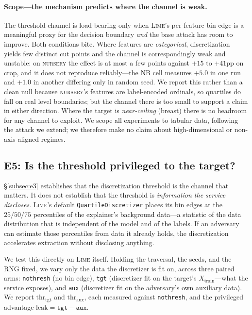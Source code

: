 \documentclass[sigconf,anonymous,review]{acmart}
\begin{document}
\paragraph{Scope---the mechanism predicts where the channel is weak.} The threshold channel is
load-bearing only when \textsc{Lime}'s per-feature bin edge is a meaningful proxy for the decision
boundary \emph{and} the base attack has room to improve. Both conditions bite. Where features are
\emph{categorical}, discretization yields few distinct cut points and the channel is correspondingly
weak and unstable: on \textsc{nursery} the effect is at most a few points against $+15$ to $+41$pp on
crop, and it does not reproduce reliably---the NB cell measures $+5.0$ in one run and $+1.0$ in
another differing only in random seed. We report this rather than a clean null because
\textsc{nursery}'s features are label-encoded ordinals, so quartiles do fall on real level
boundaries; but the channel there is too small to support a claim in either direction. Where the target is \emph{near-ceiling} (breast) there is
no headroom for any channel to exploit. We scope all experiments to tabular data, following the attack
we extend; we therefore make no claim about high-dimensional or non-axis-aligned regimes.

\subsection{E5: Is the threshold privileged to the target?}
\label{subsec:e5}
\S\ref{subsec:e3} establishes that the discretization threshold is the channel that matters. It does
not establish that the threshold is \emph{information the service discloses}. \textsc{Lime}'s default
\texttt{QuartileDiscretizer} places its bin edges at the $25/50/75$ percentiles of the explainer's
background data---a statistic of the data distribution that is independent of the model and of the
labels. If an adversary can estimate those percentiles from data it already holds, the discretization
accelerates extraction without disclosing anything.

We test this directly on \textsc{Lime} itself. Holding the traversal, the seeds, and the RNG fixed, we
vary only the data the discretizer is fit on, across three paired arms: \texttt{nothresh} (no bin
edge), \texttt{tgt} (discretizer fit on the target's $X_{\text{train}}$---what the service exposes),
and \texttt{aux} (discretizer fit on the adversary's own auxiliary data). We report
$\text{thr}_{\text{tgt}}$ and $\text{thr}_{\text{aux}}$, each measured against \texttt{nothresh}, and
the privileged advantage $\text{leak}=\texttt{tgt}-\texttt{aux}$.
\end{document}
